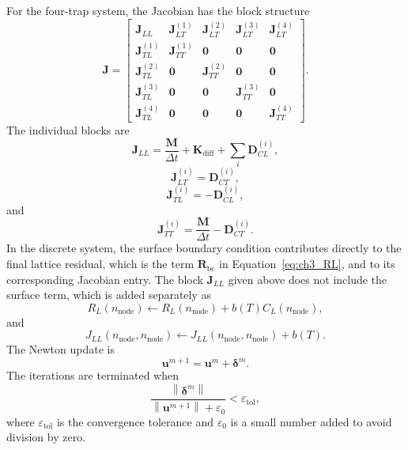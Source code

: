 \documentclass[a4paper,12pt,oneside]{report}
\begin{document}
For the four-trap system, the Jacobian has the block structure
\begin{equation}
\mathbf{J}
=
\begin{bmatrix}
\mathbf{J}_{LL}
&
\mathbf{J}_{LT}^{(1)}
&
\mathbf{J}_{LT}^{(2)}
&
\mathbf{J}_{LT}^{(3)}
&
\mathbf{J}_{LT}^{(4)}
\\
\mathbf{J}_{TL}^{(1)}
&
\mathbf{J}_{TT}^{(1)}
&
\mathbf{0}&\mathbf{0}&\mathbf{0}
\\
\mathbf{J}_{TL}^{(2)}
&
\mathbf{0}
&
\mathbf{J}_{TT}^{(2)}
&
\mathbf{0}&\mathbf{0}
\\
\mathbf{J}_{TL}^{(3)}
&
\mathbf{0}&\mathbf{0}
&
\mathbf{J}_{TT}^{(3)}
&
\mathbf{0}
\\
\mathbf{J}_{TL}^{(4)}
&
\mathbf{0}&\mathbf{0}&\mathbf{0}
&
\mathbf{J}_{TT}^{(4)}
\end{bmatrix}.
\label{eq:ch3_jacobian}
\end{equation}
The individual blocks are
\begin{equation}
\mathbf{J}_{LL}
=
\frac{\mathbf{M}}{\Delta t}
+
\mathbf{K}_{\mathrm{diff}}
+
\sum_i
\mathbf{D}_{CL}^{(i)},
\end{equation}
\begin{equation}
\mathbf{J}_{LT}^{(i)}
=
\mathbf{D}_{CT}^{(i)},
\end{equation}
\begin{equation}
\mathbf{J}_{TL}^{(i)}
=
-\mathbf{D}_{CL}^{(i)},
\end{equation}
and
\begin{equation}
\mathbf{J}_{TT}^{(i)}
=
\frac{\mathbf{M}}{\Delta t}
-
\mathbf{D}_{CT}^{(i)}.
\end{equation}
In the discrete system, the surface boundary condition contributes directly to the final lattice residual, which is the term $\mathbf{R}_{\mathrm{bc}}$ in Equation~\eqref{eq:ch3_RL}, and to its corresponding Jacobian entry. The block $\mathbf{J}_{LL}$ given above does not include the surface term, which is added separately as
\begin{equation}
R_L(n_{\mathrm{node}})
\leftarrow
R_L(n_{\mathrm{node}})+b(T)C_L(n_{\mathrm{node}}),
\end{equation}
and
\begin{equation}
J_{LL}(n_{\mathrm{node}},n_{\mathrm{node}})
\leftarrow
J_{LL}(n_{\mathrm{node}},n_{\mathrm{node}})+b(T).
\end{equation}
The Newton update is
\begin{equation}
\mathbf{u}^{m+1}
=
\mathbf{u}^{m}
+
\boldsymbol{\delta}^{m}.
\end{equation}
The iterations are terminated when
\begin{equation}
\frac{
\left\|
\boldsymbol{\delta}^{m}
\right\|
}{
\left\|
\mathbf{u}^{m+1}
\right\|
+\varepsilon_{0}
}
<
\varepsilon_{\mathrm{tol}},
\label{eq:ch3_newton_convergence}
\end{equation}
where $\varepsilon_{\mathrm{tol}}$ is the convergence tolerance and $\varepsilon_{0}$ is a small number added to avoid division by zero.
\end{document}
